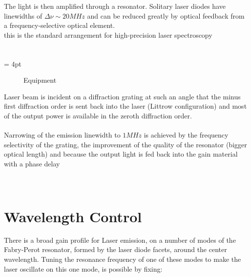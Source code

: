 \documentclass[openany,11pt,a4paper]{book}
\begin{document}
The light is then amplified through a resonator. Solitary laser diodes have linewidths of $ \Delta\nu \sim 20 MHz $ and can be reduced greatly by optical feedback from a frequency-selective optical element.\\

this is the standard arrangement for high-precision laser spectroscopy\\\\\\


\fboxsep=5mm%
\fboxrule= 4pt%

\begin{figure}[hbtp]
\centering
\caption{Equipment}
\label{fig:equipment}
\end{figure}





Laser beam is incident on a diffraction grating at such an angle that the minus first diffraction order is sent back into the laser (Littrow configuration) and most of the output power is available in the zeroth diffraction order.\\\\ 

Narrowing of the emission linewidth to $1 MHz$ is achieved by the frequency selectivity of the grating, the improvement of the quality of the resonator (bigger optical length) and because the output light is fed back into the gain material with a phase delay\\\\\\








\section{Wavelength Control}
There is a broad gain profile for Laser emission, on a number of modes of the Fabry-Perot resonator, formed by the laser diode facets, around the center wavelength.
Tuning the resonance frequency of one of these modes to make the laser oscillate on this one mode, is possible by fixing:\\
\end{document}
